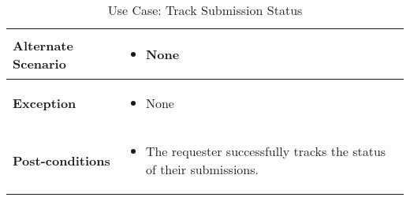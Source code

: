 \begin{table}[!ht]
\begin{tabularx}{\textwidth}{|l|X|}
        \hline
        \textbf{Alternate Scenario} & 
        \begin{itemize}[label=--,itemsep=0pt]
            \item None
        \end{itemize} \\
        \hline
        \textbf{Exception} & 
        \begin{itemize}[label=--,itemsep=0pt]
            \item None
        \end{itemize} \\
        \hline
        \textbf{Post-conditions} & 
        \begin{itemize}[label=--,itemsep=0pt]
            \item The requester successfully tracks the status of their submissions.
        \end{itemize} \\
        \hline
    \end{tabularx}
    \caption{Use Case: Track Submission Status}
    \label{tab:use-case-register}
\end{table}


